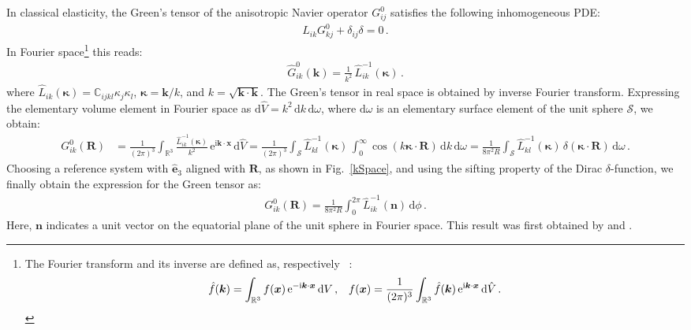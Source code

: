 In classical  elasticity, the Green's  tensor of the anisotropic Navier operator $G^0_{ij}$ satisfies the following inhomogeneous PDE:
\begin{align}
L_{ik}G^0_{kj}+\delta_{ij}\delta=0\, .
\end{align}
In Fourier space\footnote{
The  Fourier transform  and its inverse are defined as, respectively ~\citep{Wl}:
\begin{align}
\hat{f}(\bm k)=\int_{\mathbb{R}^3} f(\bm x)\, \text{e}^{-\text{i}\bm k\cdot\bm x}\, \text{d}V\,, &&
f(\bm x)=\frac{1}{(2\pi)^3}\int_{\mathbb{R}^3} \hat{f}(\bm k)\, \text{e}^{\text{i}\bm k\cdot\bm x}\, \text{d}\hat{V}\,.
\end{align}
} this reads:
\begin{align}
\hat{G}^0_{ik}(\bm k)=\frac{1}{k^2}\,\hat{L}^{-1}_{ik}(\bm \kappa)\, .
\end{align}
where $\hat{L}_{ik}(\bm \kappa)=\mathbb{C}_{ijkl}\kappa_j\kappa_l$, $\bm \kappa=\bm k/k$, and $k=\sqrt{\bm k\cdot\bm k}$. The Green's  tensor in real space  is obtained by inverse  Fourier transform. Expressing the elementary volume element in Fourier space as  $\text{d}\hat{V}=k^2\, \text{d}k\, \text{d}\omega$, where $\text{d}\omega$ is an elementary surface element of the unit sphere $\mathcal{S}$, we obtain:
\begin{align}
G^0_{ik}(\bm R)
&=\frac{1}{(2\pi)^3}\int_{\mathbb{R}^3} \frac{\hat{L}^{-1}_{ik}(\bm \kappa)}{k^2}\, \text{e}^{\text{i}\bm k\cdot\bm x} \, \text{d}\hat{V}
=\frac{1}{(2\pi)^3}\int_\mathcal{S}\hat{L}^{-1}_{kl}(\bm \kappa)\, \int_0^\infty \cos(k\bm\kappa\cdot\bm R)\, \text{d}k  \, \text{d}\omega\nonumber
=\frac{1}{8\pi^2R}\int_\mathcal{S}\hat{L}^{-1}_{kl}(\bm \kappa)\, \delta(\bm\kappa\cdot\bm R)  \, \text{d}\omega\, .
\end{align}
Choosing a reference system with $\hat{\bm e}_3$ aligned with $\bm R$, as shown in Fig.~\ref{kSpace}, and using the sifting property of the Dirac $\delta$-function, we finally obtain the expression for the Green tensor as:
\begin{align}
G^0_{ik}(\bm R)= \frac{1}{8\pi^2R}\int_0^{2\pi} \hat{L}^{-1}_{ik}(\bm n)\,  \text{d}\phi\,.
 \label{G0}
\end{align}
Here, $\bm n$ indicates a unit vector on the equatorial plane of the unit sphere in Fourier space. This result was first obtained by \cite{Lifshitz:1947aa} and \cite{Synge:1957aa}.

